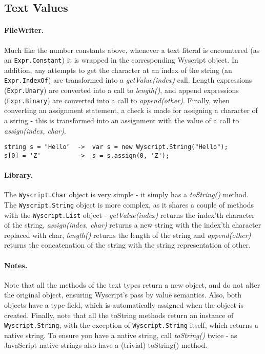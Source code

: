 \subsection{Text Values}
\label{c_types_text}

\paragraph{FileWriter.} Much like the number constants above, whenever a text literal is encountered (as an \lstinline{Expr.Constant}) it is wrapped in the corresponding Wyscript object. In addition, any attempts to get the character at an index of the string (an \lstinline{Expr.IndexOf}) are transformed into a {\em getValue(index)} call. Length expressions (\lstinline{Expr.Unary}) are converted into a call to {\em length()}, and append expressions (\lstinline{Expr.Binary}) are converted into a call to {\em append(other)}. Finally, when converting an assignment statement, a check is made for assigning a character of a string - this is transformed into an assignment with the value of a call to {\em assign(index, char)}.

\begin{lstlisting}
string s = "Hello"  ->  var s = new Wyscript.String("Hello");
s[0] = 'Z'          ->  s = s.assign(0, 'Z');
\end{lstlisting}

\paragraph{Library.} The \lstinline{Wyscript.Char} object is very simple - it simply has a {\em toString()} method. The \lstinline{Wyscript.String} object is more complex, as it shares a couple of methods with the \lstinline{Wyscript.List} object - {\em getValue(index)} returns the index'th character of the string, {\em assign(index, char)} returns a new string with the index'th character replaced with char, {\em length()} returns the length of the string and {\em append(other)} returns the concatenation of the string with the string representation of other.

\paragraph{Notes.} Note that all the methods of the text types return a new object, and do not alter the original object, ensuring Wyscript's pass by value semantics. Also, both objects have a type field, which is automatically assigned when the object is created. Finally, note that all the toString methods return an instance of \lstinline{Wyscript.String}, with the exception of \lstinline{Wyscript.String} itself, which returns a native string. To ensure you have a native string, call {\em toString()} twice - as JavaScript native strings also have a (trivial) toString() method.

